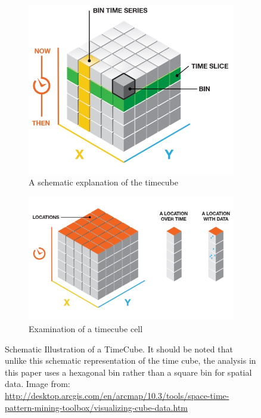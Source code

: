 \begin{figure}
	\centering
	
	
	\begin{subfigure}[b]{0.45\textwidth}
		\includegraphics[width=1\linewidth]{Figures/ChapterIV/TimeCube}
		\caption{A schematic explanation of the timecube }
		\label{fig:Timecube}
	\end{subfigure}
	\begin{subfigure}[b]{0.45\textwidth}
		\includegraphics[width=1\linewidth]{Figures/ChapterIV/Time_Cube_Slice}
		\caption{Examination of a timecube cell}
		\label{fig:timesclice}
	\end{subfigure}
	
	\caption[ESRI Schematic Illustrations of a Time-Cube]{Schematic Illustration of a TimeCube. It should be noted that unlike this schematic representation of the time cube, the analysis in this paper uses a hexagonal bin rather than a square bin for spatial data.  Image from: \url{http://desktop.arcgis.com/en/arcmap/10.3/tools/space-time-pattern-mining-toolbox/visualizing-cube-data.htm}}
	\label{fig:timecube1}
\end{figure}



